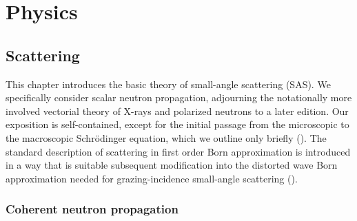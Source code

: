 
\part{Physics}\label{PPHYS}

\chapter{Scattering}  \label{SSca}

%

This chapter introduces the basic theory of small-angle scattering (SAS).
We specifically consider scalar neutron propagation,
adjourning the notationally more involved
vectorial theory of X-rays and polarized neutrons
to a later edition. %
Our exposition is self-contained,
except for the initial passage from the microscopic
to the macroscopic Schrödinger equation,
which we outline only briefly ().
The standard description of scattering in first order Born approximation
is introduced in a way that is suitable subsequent modification
into the distorted wave Born approximation
needed for grazing-incidence small-angle scattering ().


\section{Coherent neutron propagation}\label{Swave}
%
%

\def\Vmac{\tilde{V}}

